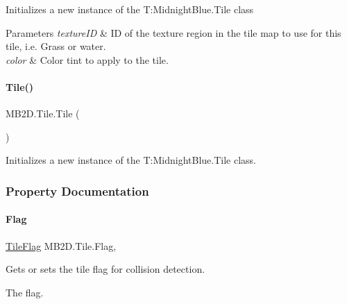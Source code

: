 Initializes a new instance of the T\+:\+Midnight\+Blue.\+Tile class 


\begin{DoxyParams}{Parameters}
{\em texture\+ID} & ID of the texture region in the tile map to use for this tile, i.\+e. Grass or water.\\
\hline
{\em color} & Color tint to apply to the tile.\\
\hline
\end{DoxyParams}
\hypertarget{class_m_b2_d_1_1_tile_a9bd9f08b191b87916f209ac7b9ce989c}{}\label{class_m_b2_d_1_1_tile_a9bd9f08b191b87916f209ac7b9ce989c} 
\paragraph{\texorpdfstring{Tile()}{Tile()}\hspace{0.1cm}{\footnotesize\ttfamily [2/2]}}
{\footnotesize\ttfamily M\+B2\+D.\+Tile.\+Tile (\begin{DoxyParamCaption}{ }\end{DoxyParamCaption})\hspace{0.3cm}{\ttfamily [inline]}}



Initializes a new instance of the T\+:\+Midnight\+Blue.\+Tile class. 



\subsubsection{Property Documentation}
\hypertarget{class_m_b2_d_1_1_tile_a46c14f1195c382dc033a26fa7ad407eb}{}\label{class_m_b2_d_1_1_tile_a46c14f1195c382dc033a26fa7ad407eb} 
\paragraph{\texorpdfstring{Flag}{Flag}}
{\footnotesize\ttfamily \hyperlink{namespace_m_b2_d_a3ff821c2c17b424864d890d0b26536ea}{Tile\+Flag} M\+B2\+D.\+Tile.\+Flag\hspace{0.3cm}{\ttfamily [get]}, {\ttfamily [set]}}



Gets or sets the tile flag for collision detection. 

The flag.\hypertarget{class_m_b2_d_1_1_tile_a4b10263cc9eeca4a37043c6d99d81ace}{}\label{class_m_b2_d_1_1_tile_a4b10263cc9eeca4a37043c6d99d81ace} 
